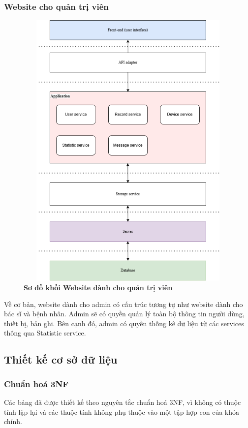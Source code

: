 \subsubsection{Website cho quản trị viên}
\begin{figure}[H]
  \centering
  \includegraphics[width=12cm,height=14cm]{Images/System/fmECG_architecture-Admin.drawio.png}
  \caption[Sơ đồ khối Website dành cho quản trị viên]{\bfseries \fontsize{12pt}{0pt}\selectfont Sơ đồ khối Website dành cho quản trị viên}
  \label{fmECG_architecture-Admin} %
\end{figure}
Về cơ bản, website dành cho admin có cấu trúc tương tự như website dành cho bác sĩ và bệnh nhân.
Admin sẽ có quyền quản lý toàn bộ thông tin người dùng, thiết bị, bản ghi. 
Bên cạnh đó, admin có quyền thống kê dữ liệu từ các services thông qua Statistic service.

\subsection{Thiết kế cơ sở dữ liệu}

\subsubsection{Chuẩn hoá 3NF}
Các bảng đã được thiết kế theo nguyên tắc chuẩn hoá 3NF, vì không có thuộc tính lặp lại và các thuộc tính không phụ thuộc vào một tập hợp con của khóa chính.

